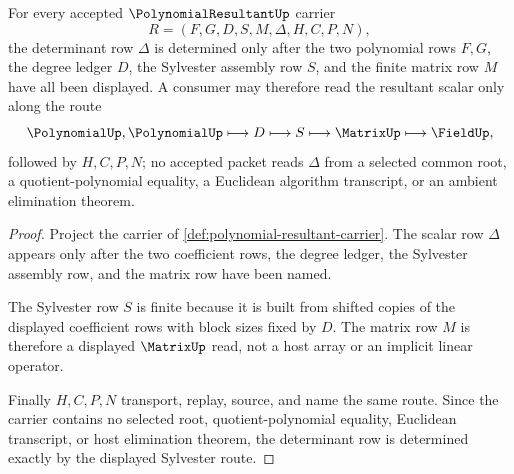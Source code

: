 \begin{theorem}
\label{thm:polynomial-resultant-sylvester-determinacy}
For every accepted $\PolynomialResultantUp$ carrier
$$
R=(F,G,D,S,M,\Delta,H,C,P,N),
$$
the determinant row $\Delta$ is determined only after the two polynomial rows $F,G$, the degree ledger $D$, the Sylvester assembly row $S$, and the finite matrix row $M$ have all been displayed. A consumer may therefore read the resultant scalar only along the route
$$
\PolynomialUp,\PolynomialUp \longmapsto D \longmapsto S \longmapsto \MatrixUp \longmapsto \FieldUp,
$$
followed by $H,C,P,N$; no accepted packet reads $\Delta$ from a selected common root, a quotient-polynomial equality, a Euclidean algorithm transcript, or an ambient elimination theorem.
\end{theorem}
\begin{proof}
Project the carrier of \autoref{def:polynomial-resultant-carrier}. The scalar row $\Delta$ appears only after the two coefficient rows, the degree ledger, the Sylvester assembly row, and the matrix row have been named.

The Sylvester row $S$ is finite because it is built from shifted copies of the displayed coefficient rows with block sizes fixed by $D$. The matrix row $M$ is therefore a displayed $\MatrixUp$ read, not a host array or an implicit linear operator.

Finally $H,C,P,N$ transport, replay, source, and name the same route. Since the carrier contains no selected root, quotient-polynomial equality, Euclidean transcript, or host elimination theorem, the determinant row is determined exactly by the displayed Sylvester route.
\end{proof}

